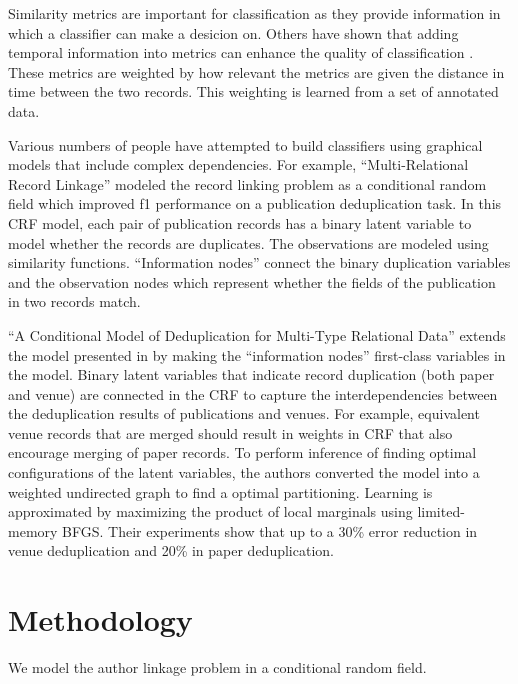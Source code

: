 \documentclass[twocolumn,letterpaper]{article}
\begin{document}
Similarity metrics are important for classification as they provide information in which a classifier can make a desicion on. Others have shown that adding temporal information into metrics can enhance the quality of classification \cite{DBLP:journals/fcsc/LiDMS12}. These metrics are weighted by how relevant the metrics are given the distance in time between the two records. This weighting is learned from a set of annotated data.

Various numbers of people have attempted to build classifiers using graphical models that include complex dependencies. For example, ``Multi-Relational Record Linkage'' \cite{Domingos04multi} modeled the record linking problem as a conditional random field which improved f1 performance on a publication deduplication task. In this CRF model, each pair of publication records has a binary latent variable to model whether the records are duplicates.  The observations are modeled using similarity functions.  ``Information nodes'' connect the binary duplication variables and the observation nodes which represent whether the fields of the publication in two records match.

``A Conditional Model of Deduplication for Multi-Type Relational Data'' \cite{Culotta05aconditional} extends the model presented in \cite{Domingos04multi} by making the ``information nodes'' first-class variables in the model.  Binary latent variables that indicate record duplication (both paper and venue) are connected in the CRF to capture the interdependencies between the deduplication results of publications and venues.  For example, equivalent venue records that are merged should result in weights in CRF that also encourage merging of paper records.  To perform inference of finding optimal configurations of the latent variables, the authors converted the model into a weighted undirected graph to find a optimal partitioning.  Learning is approximated by maximizing the product of local marginals using limited-memory BFGS.  Their experiments show that up to a 30\% error reduction in venue deduplication and 20\% in paper deduplication. 

\section{Methodology} %
\label{sec:methodology}
We model the author linkage problem in a conditional random field.
\end{document}
